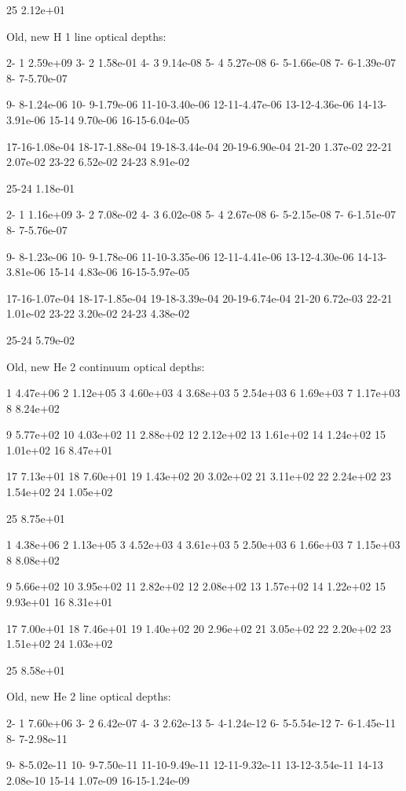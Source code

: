 {    25 2.12e+01

 Old, new H  1 line optical depths:

  2- 1 2.59e+09  3- 2 1.58e-01  4- 3 9.14e-08  5- 4 5.27e-08  6- 5-1.66e-08
7- 6-1.39e-07  8- 7-5.70e-07

  9- 8-1.24e-06 10- 9-1.79e-06 11-10-3.40e-06 12-11-4.47e-06 13-12-4.36e-06
14-13-3.91e-06 15-14 9.70e-06 16-15-6.04e-05

 17-16-1.08e-04 18-17-1.88e-04 19-18-3.44e-04 20-19-6.90e-04 21-20 1.37e-02
22-21 2.07e-02 23-22 6.52e-02 24-23 8.91e-02

 25-24 1.18e-01

  2- 1 1.16e+09  3- 2 7.08e-02  4- 3 6.02e-08  5- 4 2.67e-08  6- 5-2.15e-08
7- 6-1.51e-07  8- 7-5.76e-07

  9- 8-1.23e-06 10- 9-1.78e-06 11-10-3.35e-06 12-11-4.41e-06 13-12-4.30e-06
14-13-3.81e-06 15-14 4.83e-06 16-15-5.97e-05

 17-16-1.07e-04 18-17-1.85e-04 19-18-3.39e-04 20-19-6.74e-04 21-20 6.72e-03
22-21 1.01e-02 23-22 3.20e-02 24-23 4.38e-02

 25-24 5.79e-02

 Old, new He 2 continuum optical depths:

     1 4.47e+06     2 1.12e+05     3 4.60e+03     4 3.68e+03     5 2.54e+03
6 1.69e+03     7 1.17e+03     8 8.24e+02

     9 5.77e+02    10 4.03e+02    11 2.88e+02    12 2.12e+02    13 1.61e+02
14 1.24e+02    15 1.01e+02    16 8.47e+01

    17 7.13e+01    18 7.60e+01    19 1.43e+02    20 3.02e+02    21 3.11e+02
22 2.24e+02    23 1.54e+02    24 1.05e+02

    25 8.75e+01

     1 4.38e+06     2 1.13e+05     3 4.52e+03     4 3.61e+03     5 2.50e+03
6 1.66e+03     7 1.15e+03     8 8.08e+02

     9 5.66e+02    10 3.95e+02    11 2.82e+02    12 2.08e+02    13 1.57e+02
14 1.22e+02    15 9.93e+01    16 8.31e+01

    17 7.00e+01    18 7.46e+01    19 1.40e+02    20 2.96e+02    21 3.05e+02
22 2.20e+02    23 1.51e+02    24 1.03e+02

    25 8.58e+01

 Old, new He 2 line optical depths:

  2- 1 7.60e+06  3- 2 6.42e-07  4- 3 2.62e-13  5- 4-1.24e-12  6- 5-5.54e-12
7- 6-1.45e-11  8- 7-2.98e-11

  9- 8-5.02e-11 10- 9-7.50e-11 11-10-9.49e-11 12-11-9.32e-11 13-12-3.54e-11
14-13 2.08e-10 15-14 1.07e-09 16-15-1.24e-09

}
